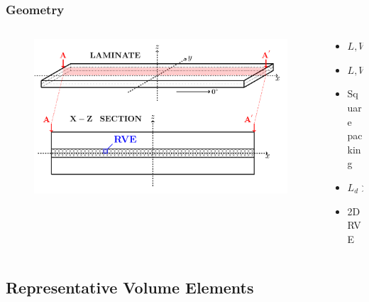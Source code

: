 \documentclass[first,firstsupp,lastsupp,last,hyperref,table]{ETHclass}
\begin{document}
\begin{frame}
\frametitle{\vspace{0.2cm}\small Geometry}
\vspace{-1cm}
\centering
\begin{columns}[c]
\begin{column}{0.85\textwidth}
\begin{figure}
\centering
\includegraphics[width=\columnwidth]{laminate-section.pdf}
\end{figure}
\end{column}
\begin{column}{0.15\textwidth}
\scriptsize
\begin{itemize}[label=]
\item $L, W >> t$
\item $L, W \rightarrow \infty$
\item Square packing
\item$L_{d} >> \Delta\theta_{d}$
\item 2D RVE
\end{itemize}
\end{column}
\end{columns}
\end{frame}

\subsection{Representative Volume Elements}
\end{document}
